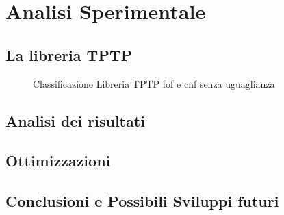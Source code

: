 \documentclass[./main.tex]{subfiles}
\begin{document}
\chapter{Analisi Sperimentale}
\section{La libreria TPTP}
\begin{figure}[h]
    \centering
    \caption{Classificazione Libreria TPTP fof e cnf senza uguaglianza}
    \label{fig:classificazione_tptp}
\end{figure}
\section{Analisi dei risultati}



% 
% 

% 
% 




\section{Ottimizzazioni}
\section{Conclusioni e Possibili Sviluppi futuri}
\end{document}
